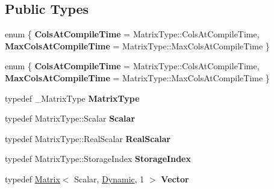\subsection*{Public Types}
\begin{DoxyCompactItemize}
\item 
\mbox{\label{class_eigen_1_1_super_l_u_base_a0b38714ac7b2e0729bc49a5509dfd5c1}} 
enum \{ {\bfseries Cols\+At\+Compile\+Time} = Matrix\+Type\+:\+:Cols\+At\+Compile\+Time, 
{\bfseries Max\+Cols\+At\+Compile\+Time} = Matrix\+Type\+:\+:Max\+Cols\+At\+Compile\+Time
 \}
\item 
\mbox{\label{class_eigen_1_1_super_l_u_base_a1d6f7b3d3e976f2270236fff9d680c11}} 
enum \{ {\bfseries Cols\+At\+Compile\+Time} = Matrix\+Type\+:\+:Cols\+At\+Compile\+Time, 
{\bfseries Max\+Cols\+At\+Compile\+Time} = Matrix\+Type\+:\+:Max\+Cols\+At\+Compile\+Time
 \}
\item 
\mbox{\label{class_eigen_1_1_super_l_u_base_a41cb4cb4e8a548b9112c3f3cdba4782e}} 
typedef \+\_\+\+Matrix\+Type {\bfseries Matrix\+Type}
\item 
\mbox{\label{class_eigen_1_1_super_l_u_base_a4d2c46083f0f2167e36a02de2e7fd4d1}} 
typedef Matrix\+Type\+::\+Scalar {\bfseries Scalar}
\item 
\mbox{\label{class_eigen_1_1_super_l_u_base_ad8e16b5721aa493c0093862f58d3de0e}} 
typedef Matrix\+Type\+::\+Real\+Scalar {\bfseries Real\+Scalar}
\item 
\mbox{\label{class_eigen_1_1_super_l_u_base_a2b9a744f9d881b6c98dc3c975da11e2f}} 
typedef Matrix\+Type\+::\+Storage\+Index {\bfseries Storage\+Index}
\item 
\mbox{\label{class_eigen_1_1_super_l_u_base_a0b9fae173ef6689999ae774c8c2707f7}} 
typedef \hyperlink{group___core___module_class_eigen_1_1_matrix}{Matrix}$<$ Scalar, \hyperlink{namespace_eigen_ad81fa7195215a0ce30017dfac309f0b2}{Dynamic}, 1 $>$ {\bfseries Vector}
\item 
\mbox{\label{class_eigen_1_1_super_l_u_base_af42c2a35e69ded5dd96bbff3adf519d5}} 

\end{DoxyCompactItemize}
